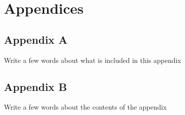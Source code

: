 \chapter*{Appendices}

\section*{Appendix A}
Write a few words about what is included in this appendix

\newpage
\section*{Appendix B}
Write a few words about the contents of the appendix